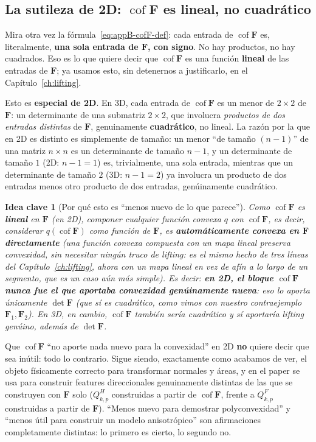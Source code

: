\documentclass[11pt,a4paper]{article}
\newtheorem{takeaway}{Idea clave}
\newcommand{\Cof}{\operatorname{cof}}
\begin{document}
\subsection{La sutileza de 2D: $\Cof\bm F$ es lineal, no cuadr\'atico}

Mira otra vez la f\'ormula~\eqref{eq:appB-cofF-def}: cada entrada de
$\Cof\bm F$ es, literalmente, \textbf{una sola entrada de $\bm F$, con
signo}. No hay productos, no hay cuadrados. Eso es lo que quiere decir
que $\Cof\bm F$ es una funci\'on \textbf{lineal} de las entradas de
$\bm F$; ya usamos esto, sin detenernos a justificarlo, en el
Cap\'itulo~\ref{ch:lifting}.

Esto es \textbf{especial de 2D}. En 3D, cada entrada de $\Cof\bm F$ es
un menor de $2\times2$ de $\bm F$: un determinante de una submatriz
$2\times2$, que involucra \emph{productos de dos entradas distintas}
de $\bm F$, genuinamente \textbf{cuadr\'atico}, no lineal. La raz\'on
por la que en 2D es distinto es simplemente de tama\~no: un menor
``de tama\~no $(n-1)$'' de una matriz $n\times n$ es un determinante de
tama\~no $n-1$, y un determinante de tama\~no $1$ (2D: $n-1=1$) es,
trivialmente, una sola entrada, mientras que un determinante de
tama\~no $2$ (3D: $n-1=2$) ya involucra un producto de dos entradas
menos otro producto de dos entradas, gen\'uinamente cuadr\'atico.

\begin{takeaway}[Por qu\'e esto es ``menos nuevo de lo que parece'']
Como $\Cof\bm F$ es \textbf{lineal} en $\bm F$ (en 2D), componer
cualquier funci\'on convexa $q$ con $\Cof\bm F$, es decir, considerar
$q(\Cof\bm F)$ como funci\'on de $\bm F$, es \textbf{autom\'aticamente
convexa en $\bm F$ directamente} (una funci\'on convexa compuesta con
un mapa \emph{lineal} preserva convexidad, sin necesitar ning\'un
truco de lifting: es el mismo hecho de tres l\'ineas del
Cap\'itulo~\ref{ch:lifting}, ahora con un mapa lineal en vez de af\'in
a lo largo de un segmento, que es un caso a\'un m\'as simple). Es decir:
\textbf{en 2D, el bloque $\Cof\bm F$ nunca fue el que aportaba
convexidad gen\'uinamente nueva}: eso lo aporta \'unicamente
$\det\bm F$ (que s\'i es cuadr\'atico, como vimos con nuestro
contraejemplo $\bm F_1,\bm F_2$). En 3D, en cambio, $\Cof\bm F$
tambi\'en ser\'ia cuadr\'atico y s\'i aportar\'ia lifting gen\'uino,
adem\'as de $\det\bm F$.
\end{takeaway}

Que $\Cof\bm F$ ``no aporte nada nuevo para la convexidad'' en 2D
\textbf{no} quiere decir que sea in\'util: todo lo contrario. Sigue
siendo, exactamente como acabamos de ver, el objeto f\'isicamente
correcto para transformar normales y \'areas, y en el paper se usa
para construir features direccionales genuinamente distintas de las
que se construyen con $\bm F$ solo ($Q_{k,p}^H$ construidas a partir
de $\Cof\bm F$, frente a $Q_{k,p}^F$ construidas a partir de $\bm F$).
``Menos nuevo para demostrar polyconvexidad'' y ``menos \'util para
construir un modelo anisotr\'opico'' son afirmaciones completamente
distintas: lo primero es cierto, lo segundo no.
\end{document}
